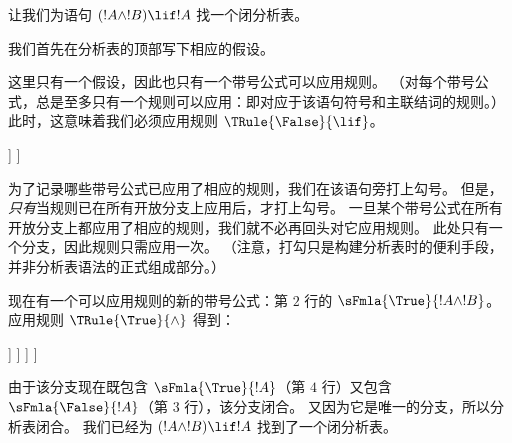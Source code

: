 \documentclass[../../../include/open-logic-section]{subfiles}
\begin{document}
      {}
      {}


\begin{ex}
让我们为语句 $(!A \land !B) \lif !A$ 找一个闭分析表。

我们首先在分析表的顶部写下相应的假设。
\begin{oltableau}
  [\sFmla{\False}{(\formula{A} \land \formula{B}) \lif \formula{A}},
    just = \TAss]
\end{oltableau}

这里只有一个假设，因此也只有一个带号公式可以应用规则。
（对每个带号公式，总是至多只有一个规则可以应用：即对应于该语句符号和主联结词的规则。）
此时，这意味着我们必须应用规则 $\TRule{\False}{\lif}$。
\begin{oltableau}
  [\sFmla{\False}{(\formula{A} \land \formula{B}) \lif \formula{A}},
    checked, just = \TAss
    [\sFmla{\True}{\formula{A} \land \formula{B}},
      just={\TRule{\False}{\lif}[1]}
      [\sFmla{\False}{\formula{A}}, just={\TRule{\False}{\lif}[1]}]
    ]
  ]
\end{oltableau}
为了记录哪些带号公式已应用了相应的规则，我们在该语句旁打上勾号。
但是，\emph{只有}当规则已在所有开放分支上应用后，才打上勾号。
一旦某个带号公式在所有开放分支上都应用了相应的规则，我们就不必再回头对它应用规则。
此处只有一个分支，因此规则只需应用一次。
（注意，打勾只是构建分析表时的便利手段，并非分析表语法的正式组成部分。）

现在有一个可以应用规则的新的带号公式：第 $2$ 行的 $\sFmla{\True}{!A \land !B}$。
应用规则 $\TRule{\True}{\land}$ 得到：
\begin{oltableau}
  [\sFmla{\False}{(\formula{A} \land \formula{B}) \lif \formula{A}},
    checked, just = \TAss
    [\sFmla{\True}{\formula{A} \land \formula{B}},
      just={\TRule{\False}{\lif}[1]}, checked
      [\sFmla{\False}{\formula{A}}, just={\TRule{\False}{\lif}[1]}
        [\sFmla{\True}{\formula{A}}, just={\TRule{\True}{\land}[2]}
          [\sFmla{\True}{\formula{B}}, just={\TRule{\True}{\land}[2]}, close
          ]
        ]
      ]
    ]
  ]
\end{oltableau}
由于该分支现在既包含 $\sFmla{\True}{!A}$（第 $4$ 行）又包含 $\sFmla{\False}{!A}$（第 $3$ 行），该分支闭合。
又因为它是唯一的分支，所以分析表闭合。
我们已经为 $(!A \land !B) \lif !A$ 找到了一个闭分析表。
\end{ex}
\end{document}
